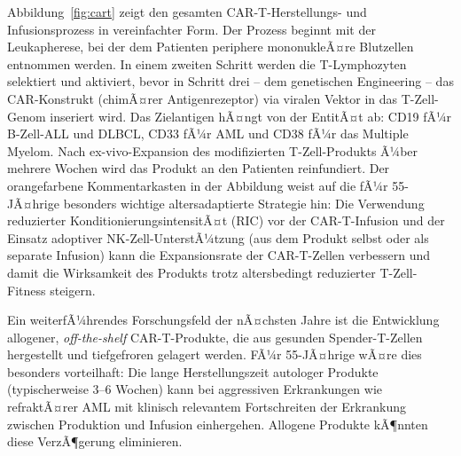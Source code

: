﻿\documentclass[12pt,a4paper]{article}
\theoremstyle{definition}
\begin{document}
Abbildung~\ref{fig:cart} zeigt den gesamten CAR-T-Herstellungs- und Infusionsprozess
in vereinfachter Form. Der Prozess beginnt mit der Leukapherese, bei der dem Patienten
periphere mononukleÃ¤re Blutzellen entnommen werden. In einem zweiten Schritt werden
die T-Lymphozyten selektiert und aktiviert, bevor in Schritt drei -- dem genetischen
Engineering -- das CAR-Konstrukt (chimÃ¤rer Antigenrezeptor) via viralen Vektor
in das T-Zell-Genom inseriert wird. Das Zielantigen hÃ¤ngt von der EntitÃ¤t ab: CD19
fÃ¼r B-Zell-ALL und DLBCL, CD33 fÃ¼r AML und CD38 fÃ¼r das Multiple Myelom. Nach
ex-vivo-Expansion des modifizierten T-Zell-Produkts Ã¼ber mehrere Wochen wird das
Produkt an den Patienten reinfundiert. Der orangefarbene Kommentarkasten in der
Abbildung weist auf die fÃ¼r 55-JÃ¤hrige besonders wichtige altersadaptierte
Strategie hin: Die Verwendung reduzierter KonditionierungsintensitÃ¤t (RIC) vor
der CAR-T-Infusion und der Einsatz adoptiver NK-Zell-UnterstÃ¼tzung (aus dem
Produkt selbst oder als separate Infusion) kann die Expansionsrate der CAR-T-Zellen
verbessern und damit die Wirksamkeit des Produkts trotz altersbedingt reduzierter
T-Zell-Fitness steigern.

Ein weiterfÃ¼hrendes Forschungsfeld der nÃ¤chsten Jahre ist die Entwicklung
allogener, \emph{off-the-shelf} CAR-T-Produkte, die aus gesunden Spender-T-Zellen
hergestellt und tiefgefroren gelagert werden. FÃ¼r 55-JÃ¤hrige wÃ¤re dies besonders
vorteilhaft: Die lange Herstellungszeit autologer Produkte (typischerweise 3--6 Wochen)
kann bei aggressiven Erkrankungen wie refraktÃ¤rer AML mit klinisch relevantem Fortschreiten
der Erkrankung zwischen Produktion und Infusion einhergehen. Allogene Produkte kÃ¶nnten
diese VerzÃ¶gerung eliminieren.
\end{document}
